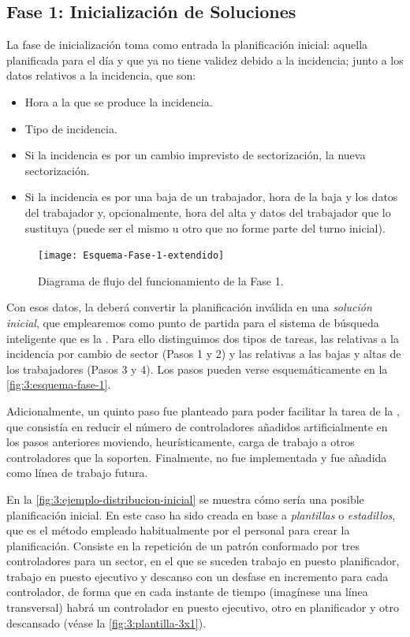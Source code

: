 \subsection{Fase 1: Inicialización de Soluciones} \label{sec:3:inicializacion-soluciones}

La fase de inicialización toma como entrada la planificación inicial: aquella planificada para el día y que ya no tiene validez debido a la incidencia; junto a los datos relativos a la incidencia, que son:

\begin{itemize}
	\item Hora a la que se produce la incidencia.
	\item Tipo de incidencia.
	\item Si la incidencia es por un cambio imprevisto de sectorización, la nueva sectorización.
	\item Si la incidencia es por una baja de un trabajador, hora de la baja y los datos del trabajador y, opcionalmente, hora del alta y datos del trabajador que lo sustituya (puede ser el mismo u otro que no forme parte del turno inicial).
\end{itemize}

\begin{figure}[htbp]
	\centering
	\texttt{[image: Esquema-Fase-1-extendido]}
	\caption{Diagrama de flujo del funcionamiento de la Fase 1.}
	\label{fig:3:esquema-fase-1}
\end{figure}

Con esos datos, la \faseuno{} deberá convertir la planificación inválida en una \textit{solución inicial}, que 
emplearemos como punto de partida para el sistema de búsqueda inteligente que es la \fasedos{}.
Para ello distinguimos dos tipos de tareas, las relativas a la incidencia por cambio de sector (Pasos 1 y 2) y las relativas a las bajas y altas de los trabajadores (Pasos 3 y 4).
Los pasos pueden verse esquemáticamente en la \autoref{fig:3:esquema-fase-1}.

Adicionalmente, un quinto paso fue planteado para poder facilitar la tarea de la \fasedos{}, que consistía en reducir el número de controladores añadidos artificialmente en los pasos anteriores moviendo, heurísticamente, carga de trabajo a otros controladores que la soporten.
Finalmente, no fue implementada y fue añadida como línea de trabajo futura.

En la \autoref{fig:3:ejemplo-distribucion-inicial} se muestra cómo sería una posible planificación inicial.
En este caso ha sido creada en base a \textit{plantillas} o \textit{estadillos}, que es el método empleado habitualmente por el personal para crear la planificación.
Consiste en la repetición de un patrón conformado por tres controladores para un sector, en el que se suceden trabajo en puesto planificador, trabajo en puesto ejecutivo y descanso con un desfase en incremento para cada controlador, de forma que en cada instante de tiempo (imagínese una línea transversal) habrá un controlador en puesto ejecutivo, otro en planificador y otro descansado (véase  la \autoref{fig:3:plantilla-3x1}).

